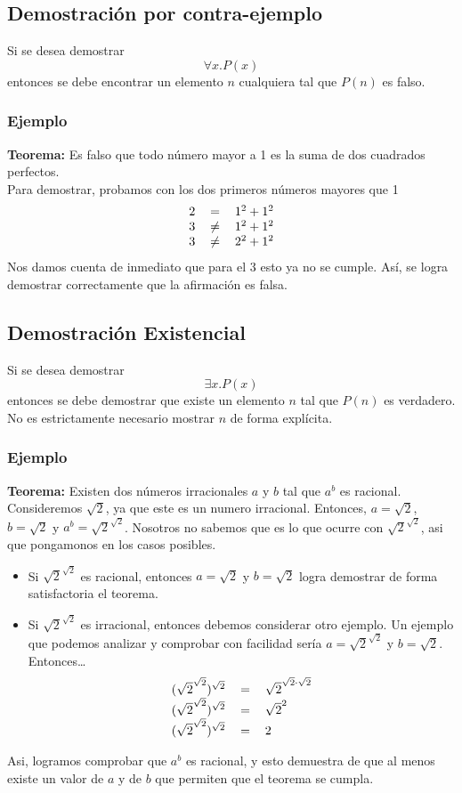 \documentclass[../main.tex]{subfiles}
\begin{document}
\subsection{Demostración por contra-ejemplo}
Si se desea demostrar
\[ \forall x . P(x) \]
entonces se debe encontrar un elemento $n$ cualquiera tal que $P(n)$ es falso.
\subsubsection*{Ejemplo}
\textbf{Teorema:} Es falso que todo número mayor a 1 es la suma de dos cuadrados perfectos.\\
Para demostrar, probamos con los dos primeros números mayores que 1
\[
    \begin{tabular}{rcl}
        $2$ & $=$ & $1^2 + 1^2$\\
        $3$ & $\not=$ & $1^2 + 1^2$\\
        $3$ & $\not=$ & $2^2 + 1^2$\\
    \end{tabular}
\]
Nos damos cuenta de inmediato que para el 3 esto ya no se cumple. Así, se logra demostrar correctamente que la afirmación es falsa.

\subsection{Demostración Existencial}
Si se desea demostrar
\[ \exists x . P(x) \]
entonces se debe demostrar que existe un elemento $n$ tal que $P(n)$ es verdadero. No es estrictamente necesario mostrar $n$ de forma explícita.
\subsubsection*{Ejemplo}
\textbf{Teorema:} Existen dos números irracionales $a$ y $b$ tal que $a^b$ es racional.\\
Consideremos $\sqrt{2}$, ya que este es un numero irracional. Entonces, $a = \sqrt{2}$, $b = \sqrt{2}$ y $a^b = \sqrt{2}^{\sqrt{2}}$. Nosotros no sabemos que es lo que ocurre con $\sqrt{2}^{\sqrt{2}}$, asi que pongamonos en los casos posibles.
\begin{itemize}
    \item Si $\sqrt{2}^{\sqrt{2}}$ es racional, entonces $a = \sqrt{2}$ y $b = \sqrt{2}$ logra demostrar de forma satisfactoria el teorema.
    \item Si $\sqrt{2}^{\sqrt{2}}$ es irracional, entonces debemos considerar otro ejemplo. Un ejemplo que podemos analizar y comprobar con facilidad sería $a = \sqrt{2}^{\sqrt{2}}$ y $b = \sqrt{2}$. Entonces\ldots
    \[
        \begin{tabular}{rcl}
            $(\sqrt{2}^{\sqrt{2}})^{\sqrt{2}}$ & $=$ & $\sqrt{2}^{\sqrt{2} \cdot{} \sqrt{2}}$\\
            $(\sqrt{2}^{\sqrt{2}})^{\sqrt{2}}$ & $=$ & $\sqrt{2}^{2}$\\
            $(\sqrt{2}^{\sqrt{2}})^{\sqrt{2}}$ & $=$ & $2$
        \end{tabular}
    \]
\end{itemize}
Asi, logramos comprobar que $a^b$ es racional, y esto demuestra de que al menos existe un valor de $a$ y de $b$ que permiten que el teorema se cumpla.
\end{document}

